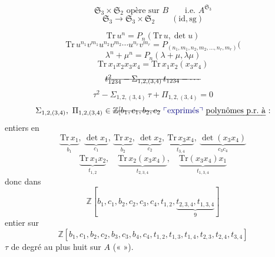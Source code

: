 \documentclass[11pt,a4paper]{article}
\begin{document}
\[
  \mathfrak{S}_3 \times \mathfrak{S}_2 \text{ opère sur } B \qquad \text{i.e.\ } A^{\mathfrak{S}_3}
\]
\[
  \mathfrak{S}_3 \longrightarrow \mathfrak{S}_3 \times \mathfrak{S}_2 \qquad (\mathrm{id}, \mathrm{sg})
\]

\[
  \mathrm{Tr}\, u^n = P_n(\mathrm{Tr}\, u, \det u)
\]
\[
  \mathrm{Tr}\, u^{n_1} v^{m_1} u^{n_2} v^{m_2} \cdots u^{n_r} v^{m_r}
  = P_{(n_1, m_1, n_2, m_2, \ldots, n_r, m_r)}(
\]
\[
  \lambda^n + \mu^n = P_n(\lambda + \mu, \lambda\mu)
\]
\[
  \mathrm{Tr}\, x_1 x_2 x_3 x_4 = \mathrm{Tr}\, x_1 x_2 (x_3 x_4)
\]
\[
  \text{\struck{$t_{1234}^2 - \Sigma_{1,2,(3,4)}\, t_{1234} - \cdots$}}
\]
\[
  \tau^2 - \Sigma_{1,2,(3,4)}\, \tau + \Pi_{1,2,(3,4)} = 0
\]
\[
  \Sigma_{1,2,(3,4)}, \ \Pi_{1,2,(3,4)} \in
  \text{\struck{$\mathbb{Z}[b_1, c_1, b_2, c_2$}} \ \text{\add{exprimés} \uncertain{polynômes p.r.\ à} :}
\]
entiers en
\[
  \underbrace{\mathrm{Tr}\, x_1}_{b_1}, \ \underbrace{\det x_1}_{c_1}, \
  \underbrace{\mathrm{Tr}\, x_2}_{b_2}, \ \underbrace{\det x_2}_{c_2}, \
  \underbrace{\mathrm{Tr}\, x_3 x_4}_{t_{3,4}}, \ \underbrace{\det(x_3 x_4)}_{c_3 c_4}
\]
\[
  \underbrace{\mathrm{Tr}\, x_1 x_2}_{t_{1,2}}, \quad
  \underbrace{\mathrm{Tr}\, x_2(x_3 x_4)}_{t_{2,3,4}}, \quad
  \underbrace{\mathrm{Tr}(x_3 x_4) x_1}_{t_{1,3,4}}
\]
donc dans
\[
  \mathbb{Z}[b_1, c_1, b_2, c_2, c_3, c_4, t_{1,2}, \underbrace{t_{2,3,4}, t_{1,3,4}}_{9}]
\]
entier sur
\[
  \mathbb{Z}[b_1, c_1, b_2, c_2, b_3, c_3, b_4, c_4, t_{1,2}, t_{1,3}, t_{1,4},
  t_{2,3}, t_{2,4}, t_{3,4}]
\]
$\tau$ de degré au plus huit sur $A$ («  »).
\end{document}
